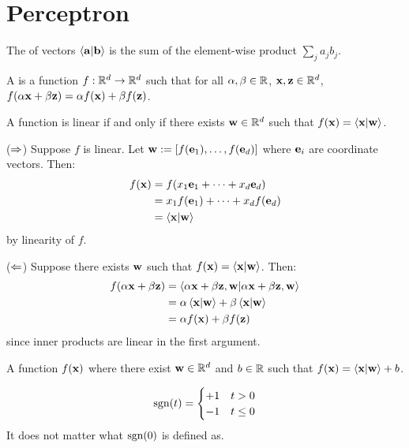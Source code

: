 \documentclass[class=cs480,notes,tikz]{agony}
\begin{document}
\section{Perceptron}

\begin{defn}
  The  of vectors $\ip{\vb a}{\vb b}$
  is the sum of the element-wise product $\sum_j a_j b_j$.

  A  is a function $f : \mathbb{R}^d \to \mathbb{R}^d$
  such that for all $\alpha,\beta \in \mathbb{R}$, $\vb x, \vb z \in \mathbb{R}^d$,
  $f(\alpha\vb x + \beta\vb z) = \alpha f(\vb x) + \beta f(\vb z)$.
\end{defn}
\begin{theorem}
  A function is linear if and only if there exists $\vb w \in \mathbb{R}^d$
  such that $f(\vb x) = \ip{\vb x}{\vb w}$.
\end{theorem}
\begin{prf}
  ($\Rightarrow$) Suppose $f$ is linear.
  Let $\vb w := [f(\vb e_1), \dotsc, f(\vb e_d)]$
  where $\vb e_i$ are coordinate vectors. Then:
  \begin{align*}
    f(\vb x) & = f(x_1\vb e_1 + \dotsb + x_d \vb e_d)     \\
             & = x_1 f(\vb e_1) + \dotsb + x_d f(\vb e_d) \\
             & = \ip{\vb x}{\vb w}
  \end{align*}
  by linearity of $f$.

  ($\Leftarrow$) Suppose there exists $\vb w$ such that $f(\vb x) = \ip{\vb x}{\vb w}$.
  Then: \begin{align*}
    f(\alpha\vb x + \beta\vb z)
     & = \ip{\alpha\vb x+\beta\vb z,\vb w}                \\
     & = \alpha\ip{\vb x}{\vb w} + \beta\ip{\vb x}{\vb w} \\
     & = \alpha f(\vb x) + \beta f(\vb z)
  \end{align*}
  since inner products are linear in the first argument.
\end{prf}

\begin{defn}
  A function $f(\vb x)$ where there exist $\vb w \in \mathbb{R}^d$
  and  $b \in \mathbb{R}$ such that $f(\vb x) = \ip{\vb x}{\vb w} + b$.
\end{defn}

\begin{defn}
  \[
    \operatorname{sgn}(t) = \begin{cases}
      +1 & t > 0    \\
      -1 & t \leq 0
    \end{cases}
  \]
  It does not matter what $\operatorname{sgn}(0)$ is defined as.
\end{defn}
\end{document}
